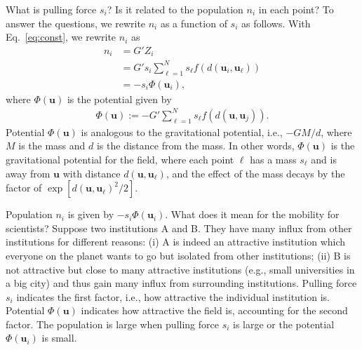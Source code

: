 \documentclass[12pt]{article} %
\def\vec#1{{\bm #1}}
\begin{document}
What is pulling force $s_i$? Is it related to the population $n_i$ in each point?
To answer the questions, we rewrite $n_i$ as a function of $s_i$ as follows. 
With Eq.~\eqref{eq:const}, we rewrite $n_i$ as 
\begin{align}
    n_i &= G' Z_i \nonumber \\
        &= G' s_i \sum_{\ell=1}^N s_\ell f\left(d\left(\vec{u}_i,\vec{u}_\ell\right)\right) \nonumber \\ 
        &= - s_i \Phi(\vec{u}_i), \label{eq:flow_gravity_model_2} %
\end{align}
where $\Phi(\vec{u})$ is the potential given by 
\begin{align}
    \Phi(\vec{u}):=-G' \sum_{\ell=1}^N s_\ell f\left(d\left(\vec{u},\vec{u}_j\right)\right).
\end{align}
Potential $\Phi(\vec{u})$ is analogous to the gravitational potential, i.e., $-GM/d$, where $M$ is the mass and $d$ is the distance from the mass.
In other words,  $\Phi(\vec{u})$ is the gravitational potential for the field, where 
each point $\ell$ has a mass $s_{\ell}$ and is away from $\vec{u}$ with distance $d(\vec{u},\vec{u}_\ell)$, and the effect of the mass decays by the factor of $\exp\left[d(\vec{u},\vec{u}_\ell) ^2 /2\right]$.

Population $n_i$ is given by $-s_i\Phi(\vec{u}_i)$. What does it mean for the mobility for scientists?
Suppose two institutions A and B. They have many influx from other institutions for different reasons:
(i) A is indeed an attractive institution which everyone on the planet wants to go but isolated from other institutions;
(ii) B is not attractive but close to many attractive institutions (e.g., small universities in a big city) and thus gain many influx from surrounding institutions.
Pulling force $s_i$ indicates the first factor, i.e., how attractive the individual institution is. 
Potential $\Phi(\vec{u})$ indicates how attractive the field is, accounting for the second factor.
The population is large when pulling force $s_i$ is large or the potential $\Phi(\vec{u}_i)$ is small. 
\end{document}
